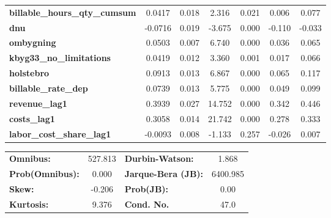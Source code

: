 \begin{center}
\begin{tabular}{lcccccc}
\textbf{billable\_hours\_qty\_cumsum}    &       0.0417  &        0.018     &     2.316  &         0.021        &        0.006    &        0.077     \\
\textbf{dnu}                             &      -0.0716  &        0.019     &    -3.675  &         0.000        &       -0.110    &       -0.033     \\
\textbf{ombygning}                       &       0.0503  &        0.007     &     6.740  &         0.000        &        0.036    &        0.065     \\
\textbf{kbyg33\_no\_limitations}         &       0.0419  &        0.012     &     3.360  &         0.001        &        0.017    &        0.066     \\
\textbf{holstebro}                       &       0.0913  &        0.013     &     6.867  &         0.000        &        0.065    &        0.117     \\
\textbf{billable\_rate\_dep}             &       0.0739  &        0.013     &     5.775  &         0.000        &        0.049    &        0.099     \\
\textbf{revenue\_lag1}                   &       0.3939  &        0.027     &    14.752  &         0.000        &        0.342    &        0.446     \\
\textbf{costs\_lag1}                     &       0.3058  &        0.014     &    21.742  &         0.000        &        0.278    &        0.333     \\
\textbf{labor\_cost\_share\_lag1}        &      -0.0093  &        0.008     &    -1.133  &         0.257        &       -0.026    &        0.007     \\
\bottomrule
\end{tabular}
\begin{tabular}{lclc}
\textbf{Omnibus:}       & 527.813 & \textbf{  Durbin-Watson:     } &    1.868  \\
\textbf{Prob(Omnibus):} &   0.000 & \textbf{  Jarque-Bera (JB):  } & 6400.985  \\
\textbf{Skew:}          &  -0.206 & \textbf{  Prob(JB):          } &     0.00  \\
\textbf{Kurtosis:}      &   9.376 & \textbf{  Cond. No.          } &     47.0  \\
\bottomrule
\end{tabular}
\end{center}